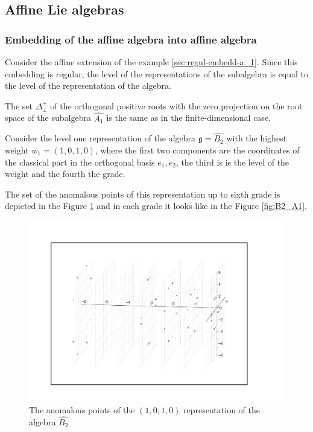 \documentclass[a4paper,12pt]{article}
\theoremstyle{definition} \newtheorem{Def}{Definition}
\begin{document}
\subsection{Affine Lie algebras}
\label{sec:affine-lie-algebras}
\subsubsection{Embedding of the affine algebra into affine algebra}
\label{sec:embedd-affine-algebr}

Consider the affine extension of the example \ref{sec:regul-embedd-a_1}.
Since this embedding is regular, the level of the representations of the subalgebra is equal to the level of the representation of the algebra.

The set $\Delta^{+}_{\bot}$ of the orthogonal positive roots with the zero projection on the root space of the subalgebra $\hat{A_1}$ is the same as in the finite-dimensional case.

Consider the level one representation of the algebra $\mathfrak{g}=\hat{B_2}$ with the highest weight $w_1=(1,0,1,0)$, where the first two components are the coordinates of the classical part in the orthogonal basis $e_1,e_2$, the third is is the level of the weight and the fourth the grade.


The set of the anomalous points of this representation up to sixth grade is depicted in the Figure \ref{fig:affine_B2_anom_point} and in each grade it looks like in the Figure \ref{fig:B2_A1}.

\begin{figure}[h!tb]
  \includegraphics[width=160mm]{AffineB2_A1_Anom.pdf}
  \caption{The anomalous points of the $(1,0,1,0)$ representation of the algebra $\hat{B_2}$}
  \label{fig:affine_B2_anom_point}
\end{figure}
\end{document}
